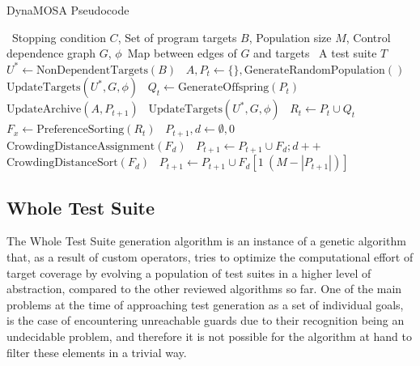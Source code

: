 \documentclass[%
  chapterprefix=false,%
  open=right,%
  twoside=true,%
  paper=a4,%
  logofile={Figures/logo.png},%
  thesistype=master,%
  UKenglish,%
]{se2thesis}
\begin{document}
\begin{algorithm}[h!]
  \centering
  \caption{DynaMOSA Pseudocode}\label{alg:DynaMOSApseudo}
  \begin{algorithmic}[1]
    \Require~Stopping condition \(C\), Set of program targets \(B\), Population size \(M\), Control dependence graph \(G\), \(\phi\)~Map between edges of \(G\) and targets
    \Ensure~A test suite \(T\)
    \State~\(U^* \gets \text{NonDependentTargets}(B)\)
    \State~\(A, P_t \gets \{\}, \text{GenerateRandomPopulation}()\)
    \State~\(\text{UpdateTargets}(U^*, G, \phi)\)
      \State~\(Q_t \gets \text{GenerateOffspring}(P_t)\)
      \State~\(\text{UpdateArchive}(A, P_{t+1})\)
      \State~\(\text{UpdateTargets}(U^*, G, \phi)\)
      \State~\(R_t \gets P_t \cup Q_t\)
      \State~\(F_x \gets \text{PreferenceSorting}(R_t)\)
      \State~\(P_{t+1}, d \gets \emptyset, 0\)
        \State~\(\text{CrowdingDistanceAssignment}(F_d)\)
        \State~\(P_{t+1} \gets P_{t+1} \cup F_d; d++\)
      \EndWhile\@
      \State~\(\text{CrowdingDistanceSort}(F_d)\)
      \State~\(P_{t+1} \gets P_{t+1} \cup F_d[1\: (M - |P_{t+1}|)]\)
    \EndWhile\@
  \end{algorithmic}
\end{algorithm}

\newpage

\subsection{Whole Test Suite}

The Whole Test Suite generation algorithm is an instance of a genetic algorithm that, as a result of custom operators, tries to optimize the computational effort of target coverage by evolving a population of test suites in a higher level of abstraction, compared to the other reviewed algorithms so far.
One of the main problems at the time of approaching test generation as a set of individual goals, is the case of encountering unreachable guards due to their recognition being an undecidable problem, and therefore it is not possible for the algorithm at hand to filter these elements in a trivial way.
\end{document}
